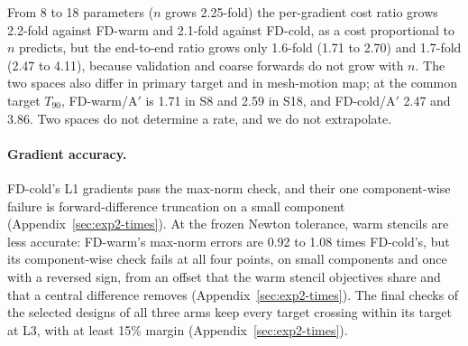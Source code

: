 From 8 to 18 parameters ($n$ grows 2.25-fold) the per-gradient cost ratio
grows 2.2-fold against FD-warm and 2.1-fold against FD-cold, as a cost
proportional to $n$ predicts, but the end-to-end ratio grows only
1.6-fold (1.71 to 2.70) and 1.7-fold (2.47 to 4.11), because validation
and coarse forwards do not grow with $n$. The two spaces also differ in
primary target and in mesh-motion map; at the common target $T_{90}$,
FD-warm/A$'$ is 1.71 in S8 and 2.59 in S18, and FD-cold/A$'$ 2.47 and
3.86. Two spaces do not determine a rate, and we do not extrapolate.

\paragraph{Gradient accuracy.}
FD-cold's L1 gradients pass the max-norm check, and their one component-wise
failure is forward-difference truncation on a small component
(Appendix~\ref{sec:exp2-times}). At the frozen Newton tolerance, warm
stencils are less accurate: FD-warm's max-norm errors are 0.92 to 1.08
times FD-cold's, but its component-wise check fails at all four points, on
small components and once with a reversed sign, from an offset that the
warm stencil objectives share and that a central difference removes
(Appendix~\ref{sec:exp2-times}). The final checks of the selected
designs of all three arms keep every target crossing within its target at
L3, with at least 15\% margin (Appendix~\ref{sec:exp2-times}).